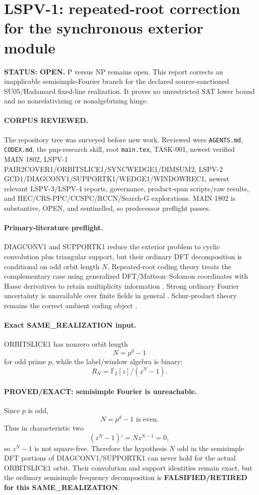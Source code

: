 \documentclass[11pt]{article}
\begin{document}
\section*{LSPV-1: repeated-root correction for the synchronous exterior module}

\textbf{STATUS: OPEN.} P versus NP remains open. This report corrects an inapplicable semisimple-Fourier branch for the declared source-sanctioned SU05/Hadamard fixed-line realization. It proves no unrestricted SAT lower bound and no nonrelativizing or nonalgebrizing hinge.

\paragraph{CORPUS REVIEWED.}
The repository tree was surveyed before new work. Reviewed were \texttt{AGENTS.md}, \texttt{CODEX.md}, the pnp-research skill, root \texttt{main.tex}, TASK-001, newest verified MAIN 1802, LSPV-1 PAIR2COVER1/ORBITSLICE1/SYNCWEDGE1/DIMSUM2, LSPV-2 GCD1/DIAGCONV1/SUPPORTK1/WEDGE1/WINDOWREC1, newest relevant LSPV-3/LSPV-4 reports, governance, product-span scripts/raw results, and HEC/CRS-PPC/CCSPC/RCCN/Search-G explorations. MAIN 1802 is substantive, OPEN, and sentinelled, so predecessor preflight passes.

\paragraph{Primary-literature preflight.}
DIAGCONV1 and SUPPORTK1 reduce the exterior problem to cyclic convolution plus triangular support, but their ordinary DFT decomposition is conditional on odd orbit length \(N\). Repeated-root coding theory treats the complementary case using generalized DFT/Mattson--Solomon coordinates with Hasse derivatives to retain multiplicity information \cite{LingNiederreiterSole,GenMS}. Strong ordinary Fourier uncertainty is unavailable over finite fields in general \cite{BorelloSole}. Schur-product theory remains the correct ambient coding object \cite{Rand}.

\paragraph{Exact SAME\_REALIZATION input.}
ORBITSLICE1 has nonzero orbit length
\[
N=p^d-1
\]
for odd prime \(p\), while the label/window algebra is binary:
\[
R_N=\mathbb F_2[z]/(z^N-1).
\]

\paragraph{PROVED/EXACT: semisimple Fourier is unreachable.}
Since \(p\) is odd,
\[
\boxed{N=p^d-1\text{ is even}.}
\]
Thus in characteristic two
\[
(z^N-1)'=Nz^{N-1}=0,
\]
so \(z^N-1\) is not square-free. Therefore the hypothesis \(N\) odd in the semisimple DFT portions of DIAGCONV1/SUPPORTK1 can never hold for the actual ORBITSLICE1 orbit. Their convolution and support identities remain exact, but the ordinary semisimple frequency decomposition is \textbf{FALSIFIED/RETIRED for this SAME\_REALIZATION}.
\end{document}
